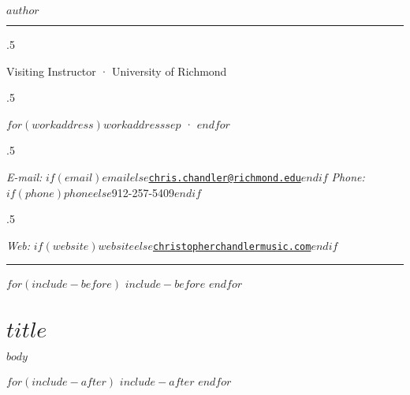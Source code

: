 \documentclass[$if(fontsize)$$fontsize$$else$12pt$endif$]{article}
\begin{document}
\thispagestyle{empty} 		%
\setcounter{secnumdepth}{0} %

\centerline{\Large \textsc{$author$}}

%

\vspace{2 mm}

\hrule

\vspace{2 mm}

\moveleft.5\hoffset\centerline{Visiting Instructor · University of Richmond}
\moveleft.5\hoffset\centerline{$for(workaddress)$$workaddress$$sep$ · $endfor$}
\moveleft.5\hoffset\centerline{
	\emph{E-mail:} \href{mailto:}{\tt $if(email)$$email$$else$chris.chandler@richmond.edu$endif$}
	\hspace{1 mm}
	\emph{Phone:} $if(phone)$$phone$$else$912-257-5409$endif$}
\moveleft.5\hoffset\centerline{
	\emph{Web:} $if(website)$\href{$website$}{\tt $website$}$else$\href{http://christopherchandlermusic.com}{\tt christopherchandlermusic.com}$endif$}

\vspace{2 mm}

\hrule

$for(include-before)$
	$include-before$
$endfor$

\section{$title$}

$body$

$for(include-after)$
	$include-after$
$endfor$
\end{document}
